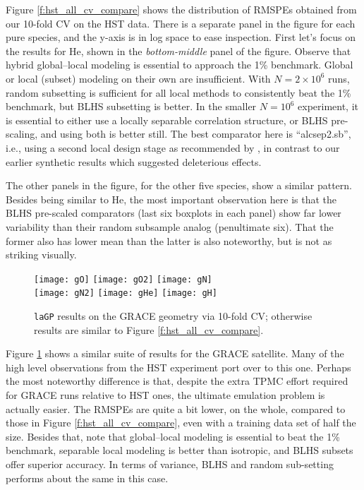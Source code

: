 \documentclass[12pt]{article}
\begin{document}
Figure \ref{f:hst_all_cv_compare} shows the distribution of RMSPEs obtained
from our 10-fold CV on the HST data.  There is a separate panel in the figure
for each pure species, and the y-axis is in log space to ease inspection.
First let's focus on the results for He, shown in the {\em bottom-middle}
panel of the figure. Observe that hybrid global--local modeling is essential
to approach the 1\% benchmark.  Global or local (subset) modeling on their own
are insufficient.  With $N=2 \times 10^6$ runs, random subsetting is sufficient
for all local methods to consistently beat the 1\% benchmark, but BLHS
subsetting is better. In the smaller $N=10^6$ experiment, it is
essential to either use a locally separable correlation structure, or BLHS
pre-scaling, and using both is better still. The best comparator here is
``alcsep2.sb'', i.e., using a second local design stage as recommended by
\citet{gramacy:apley:2015}, in contrast to our earlier synthetic results which
suggested deleterious effects.

The other panels in the figure, for the other five species, show a similar
pattern.   Besides being similar to He, the most important observation here is
that the BLHS pre-scaled comparators (last six boxplots in each panel) show
far lower variability than their random subsample analog (penultimate six).
That the former also has lower mean than the latter is also noteworthy, but is
not as striking visually.

\begin{figure}[ht!]
\texttt{[image: gO]}
\texttt{[image: gO2]}
\texttt{[image: gN]}\\

\texttt{[image: gN2]} 
\texttt{[image: gHe]}
\texttt{[image: gH]}
\caption{{\tt laGP} results on the GRACE geometry via 10-fold CV; otherwise results are similar to
Figure \ref{f:hst_all_cv_compare}.}
\label{f:grace_all_cv_compare}
\end{figure}

Figure \ref{f:grace_all_cv_compare} shows a similar suite of results for the
GRACE satellite.  Many of the high level observations from the HST experiment
port over to this one.  Perhaps the most noteworthy difference is that, despite 
the extra TPMC effort required for GRACE runs relative to HST ones, the
ultimate emulation problem is actually easier.  The RMSPEs are quite a bit
lower, on the whole, compared to those in Figure \ref{f:hst_all_cv_compare},
even with a training data set of half the size. Besides that, note that
global--local modeling is essential to beat the 1\% benchmark, separable
local modeling is better than isotropic, and BLHS subsets offer superior
accuracy.  In terms of variance, BLHS and random sub-setting performs about
the same in this case.  
\end{document}
